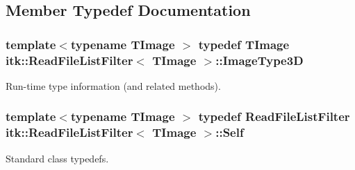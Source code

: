 \subsection{Member Typedef Documentation}
\hypertarget{classitk_1_1_read_file_list_filter_a3304e18c3540c65622d7989c8bf0f6d1}{
\subsubsection[{Image\-Type3\-D}]{\setlength{\rightskip}{0pt plus 5cm}template$<$typename T\-Image $>$ typedef T\-Image {\bf itk\-::\-Read\-File\-List\-Filter}$<$ T\-Image $>$\-::{\bf Image\-Type3\-D}}}\label{classitk_1_1_read_file_list_filter_a3304e18c3540c65622d7989c8bf0f6d1}
Run-\/time type information (and related methods). \hypertarget{classitk_1_1_read_file_list_filter_a673994032806285b12a3de9b7d536fbd}{
\subsubsection[{Self}]{\setlength{\rightskip}{0pt plus 5cm}template$<$typename T\-Image $>$ typedef {\bf Read\-File\-List\-Filter} {\bf itk\-::\-Read\-File\-List\-Filter}$<$ T\-Image $>$\-::{\bf Self}}}\label{classitk_1_1_read_file_list_filter_a673994032806285b12a3de9b7d536fbd}
Standard class typedefs. 

